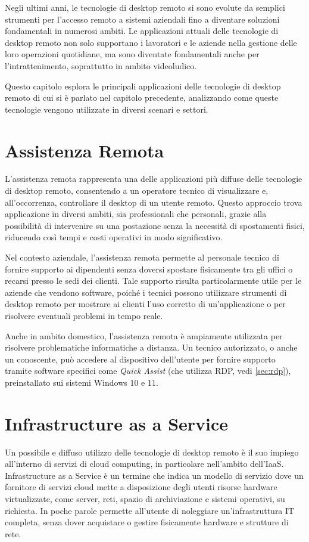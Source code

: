 \documentclass[12pt,a4paper,openright,twoside]{book}
\begin{document}
Negli ultimi anni, le tecnologie di desktop remoto si sono evolute da semplici strumenti per l’accesso remoto a sistemi aziendali fino a diventare soluzioni fondamentali in numerosi ambiti. Le applicazioni attuali delle tecnologie di desktop remoto non solo supportano i lavoratori e le aziende nella gestione delle loro operazioni quotidiane, ma sono diventate fondamentali anche per l’intrattenimento, soprattutto in ambito videoludico.

Questo capitolo esplora le principali applicazioni delle tecnologie di desktop remoto di cui si è parlato nel capitolo precedente, analizzando come queste tecnologie vengono utilizzate in diversi scenari e settori.

\section{Assistenza Remota}
\label{sec:remote-assistance}

L'assistenza remota rappresenta una delle applicazioni più diffuse delle tecnologie di desktop remoto, consentendo a un operatore tecnico di visualizzare e, all'occorrenza, controllare il desktop di un utente remoto. Questo approccio trova applicazione in diversi ambiti, sia professionali che personali, grazie alla possibilità di intervenire su una postazione senza la necessità di spostamenti fisici, riducendo così tempi e costi operativi in modo significativo.

Nel contesto aziendale, l'assistenza remota permette al personale tecnico di fornire supporto ai dipendenti senza doversi spostare fisicamente tra gli uffici o recarsi presso le sedi dei clienti. Tale supporto risulta particolarmente utile per le aziende che vendono software, poiché i tecnici possono utilizzare strumenti di desktop remoto per mostrare ai clienti l'uso corretto di un'applicazione o per risolvere eventuali problemi in tempo reale. 

Anche in ambito domestico, l'assistenza remota è ampiamente utilizzata per risolvere problematiche informatiche a distanza. Un tecnico autorizzato, o anche un conoscente, può accedere al dispositivo dell’utente per fornire supporto tramite software specifici come \textit{Quick Assist} (che utilizza RDP, vedi \ref{sec:rdp}), preinstallato sui sistemi Windows 10 e 11.



\section{Infrastructure as a Service}
\label{sec:iaas}
Un possibile e diffuso utilizzo delle tecnologie di desktop remoto è il suo impiego all'interno di servizi di cloud computing, in particolare nell'ambito dell'\ac{IaaS}.
Infrastructure as a Service è un termine che indica un modello di servizio dove un fornitore di servizi cloud mette a disposizione degli utenti risorse hardware virtualizzate, come server, reti, spazio di archiviazione e sistemi operativi, su richiesta. In poche parole permette all'utente di noleggiare un'infrastruttura IT completa, senza dover acquistare o gestire fisicamente hardware e strutture di rete.
\end{document}
